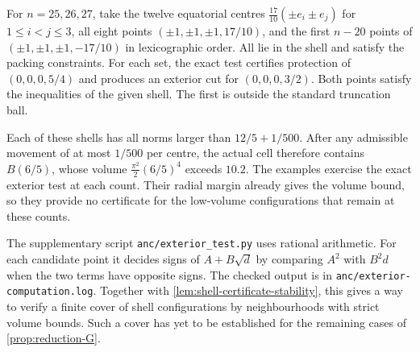 \begin{example}
For \(n=25,26,27\), take the twelve equatorial centres
\(\tfrac{17}{10}(\pm e_i\pm e_j)\) for \(1\le i<j\le3\), all eight
points \((\pm1,\pm1,\pm1,17/10)\), and the first \(n-20\) points of
\((\pm1,\pm1,\pm1,-17/10)\) in lexicographic order. All lie in the
shell and satisfy the packing constraints. For each set, the exact
test certifies protection of \((0,0,0,5/4)\) and produces an exterior
cut for \((0,0,0,3/2)\). Both points satisfy the inequalities of the
given shell. The first is outside the standard truncation ball.

Each of these shells has all norms larger than \(12/5+1/500\).
After any admissible movement of at most \(1/500\) per centre,
the actual cell therefore contains \(B(6/5)\), whose volume
\(\tfrac{\pi^2}{2}(6/5)^4\) exceeds \(10.2\). The examples
exercise the exact exterior test at each count. Their radial margin
already gives the volume bound, so they provide no certificate for
the low-volume configurations that remain at these counts.
\end{example}

The supplementary script \texttt{anc/exterior\_test.py} uses rational
arithmetic. For each candidate point it decides signs of
\(A+B\sqrt d\) by comparing \(A^2\) with \(B^2d\) when the two terms have
opposite signs. The checked output is in
\texttt{anc/exterior-computation.log}.
Together with \cref{lem:shell-certificate-stability}, this gives a
way to verify a finite cover of shell configurations by neighbourhoods
with strict volume bounds. Such a cover has yet to be established
for the remaining cases of \cref{prop:reduction-G}.
